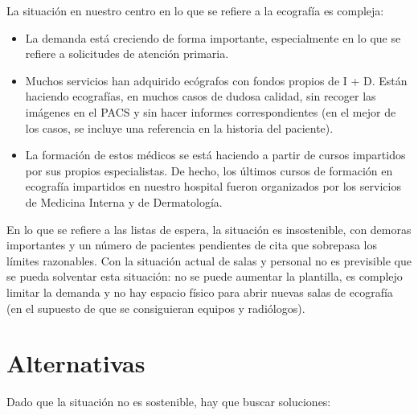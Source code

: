 \documentclass[]{article}
\providecommand{\tightlist}{%
  \setlength{\itemsep}{0pt}\setlength{\parskip}{0pt}}
\begin{document}
La situación en nuestro centro en lo que se refiere a la ecografía es compleja:

\begin{itemize}
\tightlist
\item
  La demanda está creciendo de forma importante, especialmente en lo que se refiere a solicitudes de atención primaria.
\item
  Muchos servicios han adquirido ecógrafos con fondos propios de I + D. Están haciendo ecografías, en muchos casos de dudosa calidad, sin recoger las imágenes en el PACS y sin hacer informes correspondientes (en el mejor de los casos, se incluye una referencia en la historia del paciente).
\item
  La formación de estos médicos se está haciendo a partir de cursos impartidos por sus propios especialistas. De hecho, los últimos cursos de formación en ecografía impartidos en nuestro hospital fueron organizados por los servicios de Medicina Interna y de Dermatología.
\end{itemize}

En lo que se refiere a las listas de espera, la situación es insostenible, con demoras importantes y un número de pacientes pendientes de cita que sobrepasa los límites razonables. Con la situación actual de salas y personal no es previsible que se pueda solventar esta situación: no se puede aumentar la plantilla, es complejo limitar la demanda y no hay espacio físico para abrir nuevas salas de ecografía (en el supuesto de que se consiguieran equipos y radiólogos).

\hypertarget{alternativas}{%
\section{Alternativas}\label{alternativas}}

Dado que la situación no es sostenible, hay que buscar soluciones:
\end{document}
